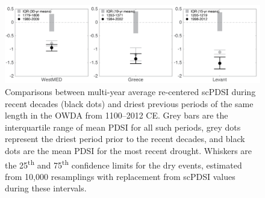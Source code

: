\documentclass[draft,jgr]{AGUTeX}
\begin{document}
\begin{figure}
\center
\includegraphics[width=1.0\columnwidth]{fig_13_pdsi_boxplot.png}
\caption{Comparisons between multi-year average re-centered scPDSI during recent decades (black dots) and driest previous periods of the same length in the OWDA from 1100--2012 CE. Grey bars are the interquartile range of mean PDSI for all such periods, grey dots represent the driest period prior to the recent decades, and black dots are the mean PDSI for the most recent drought. Whiskers are the 25\textsuperscript{th} and 75\textsuperscript{th} confidence limits for the dry events, estimated from 10,000 resamplings with replacement from scPDSI values during these intervals.}\label{placeholder}
\end{figure}

\end{document}
